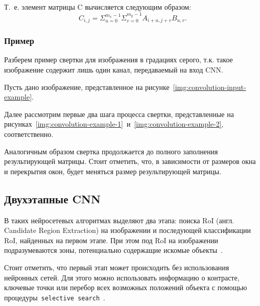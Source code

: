 Т.~е. элемент матрицы C вычисляется следующим образом:
\begin{equation}
C_{i,j} = \Sigma_{u=0}^{m_x-1} \Sigma_{v=0}^{m_y-1} A_{i+u,j+v}B_{u,v}.
\end{equation}

\subsubsection*{Пример}

Разберем пример свертки для изображения в градациях серого, т.к. такое изображение содержит лишь один канал, передаваемый на вход CNN.

Пусть дано изображение, представленное на рисунке~\ref{img:convolution-input-example}.


Далее рассмотрим первые два шага процесса свертки, представленные на рисунках~\ref{img:convolution-example-1}~и~\ref{img:convolution-example-2}, соответственно.



Аналогичным образом свертка продолжается до полного заполнения результирующей матрицы. Стоит отметить, что, в зависимости от размеров окна и перекрытия окон, будет меняться размер результирующей матрицы.

\subsection{Двухэтапные CNN}

В таких нейросетевых алгоритмах выделяют два этапа: поиска RoI (англ. Candidate Region Extraction) на изображении и последующей классификации RoI, найденных на первом этапе. При этом под RoI на изображении подразумеваются зоны, потенциально содержащие искомые объекты~\cite{overview-of-two-stage-object-detection}. 


Стоит отметить, что первый этап может происходить без использования нейронных сетей. Для этого можно использовать информацию о контрасте, ключевые точки или перебор всех возможных положений объекта с помощью процедуры~\texttt{selective search}~\cite{realtime-recognition-algorythm}.

